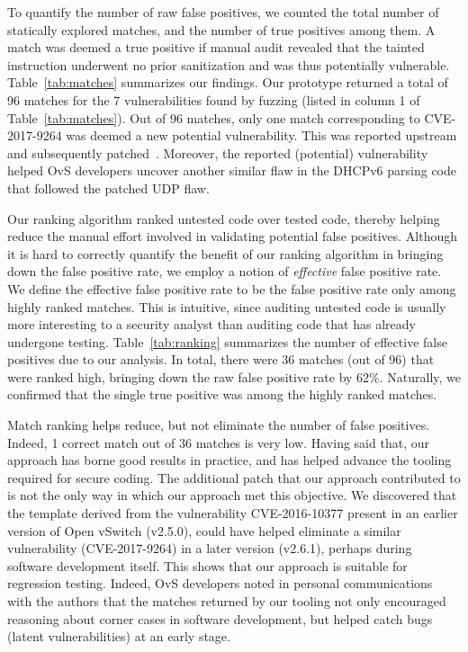 To quantify the number of raw false positives, we counted the total number of statically explored matches, and the number of true positives among them.
A match was deemed a true positive if manual audit revealed that the tainted instruction underwent no prior sanitization and was thus potentially vulnerable.
Table~\ref{tab:matches} summarizes our findings.
Our prototype returned a total of 96 matches for the 7 vulnerabilities found by fuzzing (listed in column 1 of Table~\ref{tab:matches}).
Out of 96 matches, only one match corresponding to CVE-2017-9264 was deemed a new potential vulnerability.
This was reported upstream and subsequently patched~\cite{ovsmatch}.
Moreover, the reported (potential) vulnerability helped OvS developers uncover another similar flaw in the DHCPv6 parsing code that followed the patched UDP flaw.

Our ranking algorithm ranked untested code over tested code, thereby helping reduce the manual effort involved in validating potential false positives.
Although it is hard to correctly quantify the benefit of our ranking algorithm in bringing down the false positive rate, we employ a notion of {\it effective} false positive rate.
We define the effective false positive rate to be the false positive rate only among highly ranked matches.
This is intuitive, since auditing untested code is usually more interesting to a security analyst than auditing code that has already undergone testing.
Table~\ref{tab:ranking} summarizes the number of effective false positives due to our analysis.
In total, there were 36 matches (out of 96) that were ranked high, bringing down the raw false positive rate by 62\%.
Naturally, we confirmed that the single true positive was among the highly ranked matches.

Match ranking helps reduce, but not eliminate the number of false positives.
Indeed, 1 correct match out of 36 matches is very low.
Having said that, our approach has borne good results in practice, and has helped advance the tooling required for secure coding.
The additional patch that our approach contributed to is not the only way in which our approach met this objective.
We discovered that the template derived from the vulnerability CVE-2016-10377 present in an earlier version of Open vSwitch (v2.5.0), could have helped eliminate a similar vulnerability (CVE-2017-9264) in a later version (v2.6.1), perhaps during software development itself.
This shows that our approach is suitable for regression testing.
Indeed, OvS developers noted in personal communications with the authors that the matches returned by our tooling not only encouraged reasoning about corner cases in software development, but helped catch bugs (latent vulnerabilities) at an early stage.

